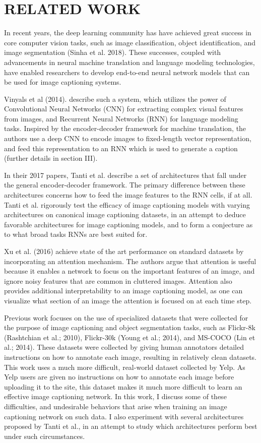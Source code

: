 \documentclass[letterpaper, 10 pt, conference]{ieeeconf}
\begin{document}
\section{RELATED WORK}

In recent years, the deep learning community has have achieved great success in core computer vision tasks, such as image classification, object identification, and image segmentation (Sinha et al. 2018). These successes, coupled with advancements in neural machine translation and language modeling technologies, have enabled researchers to develop end-to-end neural network models that can be used for image captioning systems. 

Vinyals et al (2014). describe such a system, which utilizes the power of Convolutional Neural Networks (CNN) for extracting complex visual features from images, and Recurrent Neural Networks (RNN) for language modeling tasks. Inspired by the encoder-decoder framework for machine translation, the authors use a deep CNN to encode images to fixed-length vector representation, and feed this representation to an RNN which is used to generate a caption (further details in section III). 


In their 2017 papers, Tanti et al. describe a set of architectures that fall under the general encoder-decoder framework. The primary difference between these architectures concerns how to feed the image features to the RNN cells, if at all. Tanti et al. rigorously test the efficacy of image captioning models with varying architectures on canonical image captioning datasets, in an attempt to deduce favorable architectures for image captioning models, and to form a conjecture as to what broad tasks RNNs are best suited for.

Xu et al. (2016) achieve state of the art performance on standard datasets by incorporating an attention mechanism. The authors argue that attention is useful because it enables a network to focus on the important features of an image, and ignore noisy features that are common in cluttered images. Attention also provides additional interpretability to an image captioning model, as one can visualize what section of an image the attention is focused on at each time step. 

Previous work focuses on the use of specialized datasets that were collected for the purpose of image captioning and object segmentation tasks, such as Flickr-8k (Rashtchian et al.; 2010), Flickr-30k (Young et al.; 2014), and MS-COCO (Lin et al.; 2014). These datasets were collected by giving human annotators detailed instructions on how to annotate each image, resulting in relatively clean datasets. This work uses a much more difficult, real-world dataset collected by Yelp. As Yelp users are given no instructions on how to annotate each image before uploading it to the site, this dataset makes it much more difficult to learn an effective image captioning network. In this work, I discuss some of these difficulties, and undesirable behaviors that arise when training an image captioning network on such data. I also experiment with several architectures proposed by Tanti et al., in an attempt to study which architectures perform best under such circumstances.
\end{document}

